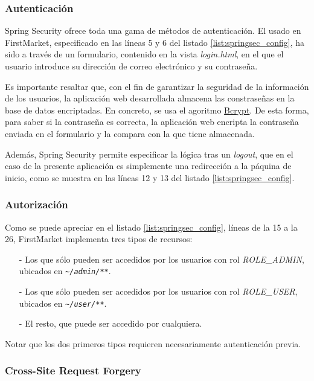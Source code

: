 \documentclass[a4paper]{article}
\begin{document}
	\subsubsection{Autenticación}
	Spring Security ofrece toda una gama de métodos de autenticación. El usado en FirstMarket, especificado en las líneas 5 y 6 del listado \ref{list:springsec_config}, ha sido a través de un formulario, contenido en la vista \emph{login.html}, en el que el usuario introduce su dirección de correo electrónico y su contraseña.
	
	Es importante resaltar que, con el fin de garantizar la seguridad de la información de los usuarios, la aplicación web desarrollada almacena las constraseñas en la base de datos encriptadas.  En concreto, se usa el agoritmo \href{https://en.wikipedia.org/wiki/Bcrypt}{Bcrypt}. De esta forma, para saber si la contraseña es correcta, la aplicación web encripta la contraseña enviada en el formulario y la compara con la que tiene almacenada.
	
	Además, Spring Security permite especificar la lógica tras un \emph{logout}, que en el caso de la presente aplicación es simplemente una redirección a la páquina de inicio, como se muestra en las líneas 12 y 13 del listado \ref{list:springsec_config}.

	\subsubsection{Autorización}
	Como se puede apreciar en el listado \ref{list:springsec_config}, líneas de la 15 a la 26, FirstMarket implementa tres tipos de recursos: 
	
	\begin{itemize}
		\item[-] Los que sólo pueden ser accedidos por los usuarios con rol \emph{ROLE\_ADMIN}, ubicados en \emph{\nolinkurl{~/admin/**}}.
		\item[-] Los que sólo pueden ser accedidos por los usuarios con rol \emph{ROLE\_USER}, ubicados en \emph{\nolinkurl{~/user/**}}.
		\item[-] El resto, que puede ser accedido por cualquiera.
	\end{itemize}

	Notar que los dos primeros tipos requieren necesariamente autenticación previa.
	
	\subsubsection{Cross-Site Request Forgery}
	
\end{document}

